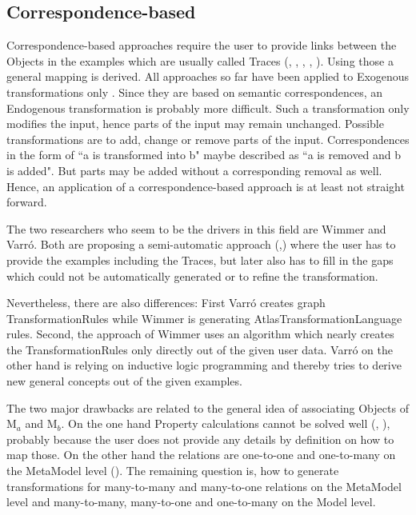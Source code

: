 \subsection{Correspondence-based}
Correspondence-based approaches require the user to provide links between the \glspl{Object} in the examples which are usually called \glspl{Trace} (\cite{Faunes2013}, \cite{Kappel2012}, \cite{Kessentini2010a}, \cite{Kessentini2010}, \cite{Wimmer2006}). Using those a general mapping is derived.
All approaches so far have been applied to \gls{Exogenous} transformations only \cite{Kappel2012}. Since they are based on semantic correspondences, an \gls{Endogenous} transformation is probably more difficult. Such a transformation only modifies the input, hence parts of the input may remain unchanged. Possible transformations are to add, change or remove parts of the input. Correspondences in the form of ``a is transformed into b" maybe described as ``a is removed and b is added". But parts may be added without a corresponding removal as well. Hence, an application of a correspondence-based approach is at least not straight forward.

The two researchers who seem to be the drivers in this field are Wimmer and Varr\'{o}. Both are proposing a semi-automatic approach (\cite{Wimmer2006},\cite{Varro2007}) where the user has to provide the examples including the \glspl{Trace}, but later also has to fill in the gaps which could not be automatically generated or to refine the transformation.

Nevertheless, there are also differences: First Varr\'{o} creates graph \glspl{TransformationRule} while Wimmer is generating \gls{AtlasTransformationLanguage} rules. Second, the approach of Wimmer uses an algorithm which nearly creates the \glspl{TransformationRule} only directly out of the given user data. Varr\'{o} on the other hand is relying on inductive logic programming and thereby tries to derive new general concepts out of the given examples.

The two major drawbacks are related to the general idea of associating \glspl{Object} of M$_a$ and M$_b$. On the one hand \gls{Property} calculations cannot be solved well (\cite{Kessentini2010a}, \cite{Kappel2012}), probably because the user does not provide any details by definition on how to map those. On the other hand the relations are one-to-one and one-to-many on the \gls{MetaModel} level (\cite{IvanGarcia-Magarino2009}). The remaining question is, how to generate transformations for many-to-many and many-to-one relations on the \gls{MetaModel} level and many-to-many, many-to-one and one-to-many on the \gls{Model} level.

